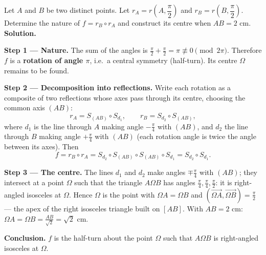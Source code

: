 \documentclass[11pt]{article}
\newcommand{\cle}[1]{{\popxbold\color{popdark}#1}}
\begin{document}
\begin{exoresolu}
Let $A$ and $B$ be two distinct points. Let $r_A = r\left(A, \dfrac{\pi}{2}\right)$ and $r_B = r\left(B, \dfrac{\pi}{2}\right)$. Determine the nature of $f = r_B \circ r_A$ and construct its centre when $AB = 2$ cm.
\tcblower
\textbf{Solution.}

\textbf{Step 1 — Nature.} The sum of the angles is $\frac{\pi}{2} + \frac{\pi}{2} = \pi \not\equiv 0 \pmod{2\pi}$. Therefore $f$ is a \textbf{rotation of angle $\pi$}, i.e.\ a \cle{central symmetry} (half-turn). Its centre $\Omega$ remains to be found.

\textbf{Step 2 — Decomposition into reflections.} Write each rotation as a composite of two reflections whose axes pass through its centre, choosing the common axis $(AB)$:
\[ r_A = S_{(AB)} \circ S_{d_1}, \qquad r_B = S_{d_2} \circ S_{(AB)}, \]
where $d_1$ is the line through $A$ making angle $-\frac{\pi}{4}$ with $(AB)$, and $d_2$ the line through $B$ making angle $+\frac{\pi}{4}$ with $(AB)$ (each rotation angle is twice the angle between its axes). Then
\[ f = r_B \circ r_A = S_{d_2} \circ S_{(AB)} \circ S_{(AB)} \circ S_{d_1} = S_{d_2} \circ S_{d_1}. \]

\textbf{Step 3 — The centre.} The lines $d_1$ and $d_2$ make angles $\mp\frac{\pi}{4}$ with $(AB)$; they intersect at a point $\Omega$ such that the triangle $A\Omega B$ has angles $\frac{\pi}{4}, \frac{\pi}{4}, \frac{\pi}{2}$: it is right-angled isosceles at $\Omega$. Hence $\Omega$ is the point with $\Omega A = \Omega B$ and $(\overrightarrow{\Omega A}, \overrightarrow{\Omega B}) = \frac{\pi}{2}$ — the apex of the right isosceles triangle built on $[AB]$. With $AB = 2$ cm: $\Omega A = \Omega B = \frac{AB}{\sqrt{2}} = \sqrt{2}$ cm.

\textbf{Conclusion.} $f$ is the half-turn about the point $\Omega$ such that $A\Omega B$ is right-angled isosceles at $\Omega$.
\end{exoresolu}
\end{document}
